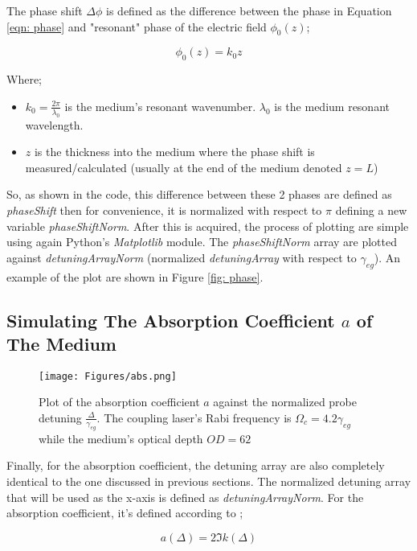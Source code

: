 The phase shift $\Delta\phi$ is defined as the difference between the phase in Equation \ref{eqn: phase} and "resonant" phase of the electric field $\phi_{0}(z)$;

\begin{equation}
    \phi_{0}(z) = k_{0}z
\end{equation}

Where;

\begin{itemize}
    \item $k_{0} = \frac{2\pi}{\lambda_{0}}$ is the medium's resonant wavenumber. $\lambda_{0}$ is the medium resonant wavelength.
    \item $z$ is the thickness into the medium where the phase shift is measured/calculated (usually at the end of the medium denoted $z = L$)
\end{itemize}

So, as shown in the code, this difference between these 2 phases are defined as \textit{phaseShift} then for convenience, it is normalized with respect to $\pi$ defining a new variable \textit{phaseShiftNorm}. After this is acquired, the process of plotting are simple using again Python's \textit{Matplotlib} module. The \textit{phaseShiftNorm} array are plotted against \textit{detuningArrayNorm} (normalized \textit{detuningArray} with respect to $\gamma_{eg}$). An example of the plot are shown in Figure \ref{fig: phase}.

\subsection{Simulating The Absorption Coefficient $a$ of The Medium}
\begin{figure}[h!]
    \centering
    \texttt{[image: Figures/abs.png]}
    \caption{Plot of the absorption coefficient $a$ against the normalized probe detuning $\frac{\Delta}{\gamma_{eg}}$. The coupling laser's Rabi frequency is $\Omega_{c} = 4.2\gamma_{eg}$ while the medium's optical depth $OD = 62$}
    \label{fig: abs}
\end{figure}

Finally, for the absorption coefficient, the detuning array are also completely identical to the one discussed in previous sections. The normalized detuning array that will be used as the x-axis is defined as \textit{detuningArrayNorm}. For the absorption coefficient, it's defined according to \cite{boyd2020nonlinear};

\begin{equation}
    a(\Delta) = 2 \Im{k(\Delta)}
\end{equation}

